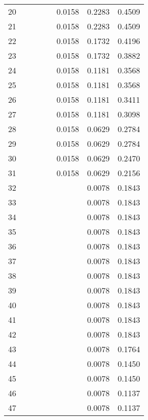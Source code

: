 \documentclass[12pt]{article}
\begin{document}
\begin{center}
\begin{longtable}{|c|c|c|c|c|c|c|c|}
            20 &  &  &  &  & 0.0158 & 0.2283 & 0.4509 \\
            21 &  &  &  &  & 0.0158 & 0.2283 & 0.4509 \\
            22 &  &  &  &  & 0.0158 & 0.1732 & 0.4196 \\
            23 &  &  &  &  & 0.0158 & 0.1732 & 0.3882 \\
            24 &  &  &  &  & 0.0158 & 0.1181 & 0.3568 \\
            25 &  &  &  &  & 0.0158 & 0.1181 & 0.3568 \\
            26 &  &  &  &  & 0.0158 & 0.1181 & 0.3411 \\
            27 &  &  &  &  & 0.0158 & 0.1181 & 0.3098 \\
            28 &  &  &  &  & 0.0158 & 0.0629 & 0.2784 \\
            29 &  &  &  &  & 0.0158 & 0.0629 & 0.2784 \\
            30 &  &  &  &  & 0.0158 & 0.0629 & 0.2470 \\
            31 &  &  &  &  & 0.0158 & 0.0629 & 0.2156 \\
            32 &  &  &  &  &  & 0.0078 & 0.1843 \\
            33 &  &  &  &  &  & 0.0078 & 0.1843 \\
            34 &  &  &  &  &  & 0.0078 & 0.1843 \\
            35 &  &  &  &  &  & 0.0078 & 0.1843 \\
            36 &  &  &  &  &  & 0.0078 & 0.1843 \\
            37 &  &  &  &  &  & 0.0078 & 0.1843 \\
            38 &  &  &  &  &  & 0.0078 & 0.1843 \\
            39 &  &  &  &  &  & 0.0078 & 0.1843 \\
            40 &  &  &  &  &  & 0.0078 & 0.1843 \\
            41 &  &  &  &  &  & 0.0078 & 0.1843 \\
            42 &  &  &  &  &  & 0.0078 & 0.1843 \\
            43 &  &  &  &  &  & 0.0078 & 0.1764 \\
            44 &  &  &  &  &  & 0.0078 & 0.1450 \\
            45 &  &  &  &  &  & 0.0078 & 0.1450 \\
            46 &  &  &  &  &  & 0.0078 & 0.1137 \\
            47 &  &  &  &  &  & 0.0078 & 0.1137 \\

\end{longtable}
\end{center}
\end{document}
